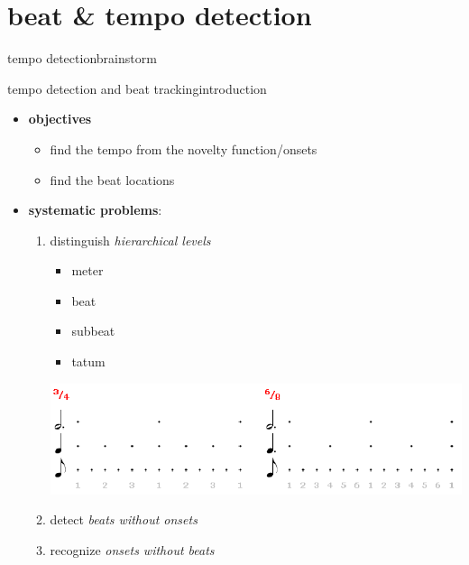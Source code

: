     \section[tempo]{beat \& tempo detection}
        \begin{frame}{tempo detection}{brainstorm}
        \end{frame}
        \begin{frame}{tempo detection and beat tracking}{introduction}
            \begin{itemize}
                \item \textbf{objectives}
                    \begin{itemize}
                        \item	find the tempo from the novelty function/onsets
                        \item	find the beat locations
                    \end{itemize}
                \bigskip
                \item<2-> \textbf{systematic problems}:
                    \begin{enumerate}
                        \item	distinguish \textit{hierarchical levels}
                            \begin{itemize}
                                \item	meter
                                \item	beat
                                \item	subbeat
                                \item	tatum
                            \end{itemize}
                            \vspace{-17mm}
                            \begin{flushright}
                                \includegraphics[scale=.25]{graph/periodiclevels}
                            \end{flushright}
                        \item<3->	detect \textit{beats without onsets}
                        \item<3->	recognize \textit{onsets without beats}
                    \end{enumerate}
            \end{itemize}
            
        \end{frame}

